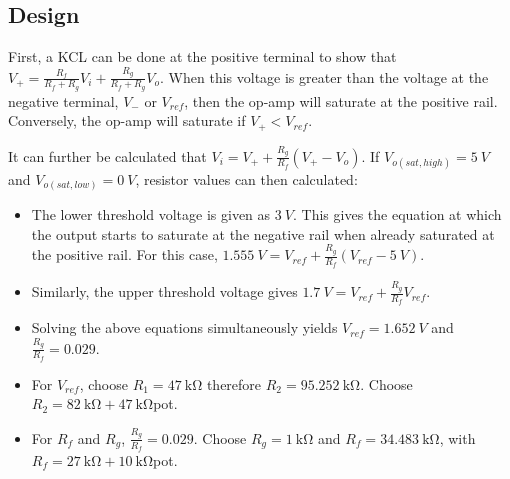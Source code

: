 \subsection{Design}

First, a KCL can be done at the positive terminal to show that $V_+ = \frac{R_f}{R_f + R_g} V_i + \frac{R_g}{R_f + R_g} V_o$.
When this voltage is greater than the voltage at the negative terminal, $V_-$ or $V_{ref}$, then the op-amp will saturate at the positive rail.
Conversely, the op-amp will saturate if $V_+ < V_{ref}$.

It can further be calculated that $V_i = V_+ + \frac{R_g}{R_f}(V_+ - V_o)$. If $V_{o(sat,high)} = \SI{5}{V}$ and $V_{o(sat,low)} = \SI{0}{V}$, resistor values can then calculated:

\begin{itemize}
    \item The lower threshold voltage is given as $\SI{3}{V}$. This gives the equation at which the output starts to saturate at the negative rail when already saturated at the positive rail.
          For this case, $\SI{1.555}{V} = V_{ref} + \frac{R_g}{R_f} (V_{ref} - \SI{5}{V})$.
    \item Similarly, the upper threshold voltage gives $\SI{1.7}{V} = V_{ref} + \frac{R_g}{R_f} V_{ref}$.
    \item Solving the above equations simultaneously yields $V_{ref} = \SI{1.652}{V}$ and $\frac{R_g}{R_f} = 0.029$.
    \item For $V_{ref}$, choose $R_1= \SI{47}{\kilo\ohm}$ therefore $R_2 = \SI{95.252}{\kilo\ohm}$. Choose $R_2 = \SI{82}{\kilo\ohm} + \SI{47}{\kilo\ohm}$pot.
    \item For $R_f$ and $R_g$, $\frac{R_g}{R_f} = 0.029$. Choose $R_g = \SI{1}{\kilo\ohm}$ and $R_f = \SI{34.483}{\kilo\ohm}$, with $R_f = \SI{27}{\kilo\ohm} + \SI{10}{\kilo\ohm}$pot.
\end{itemize}